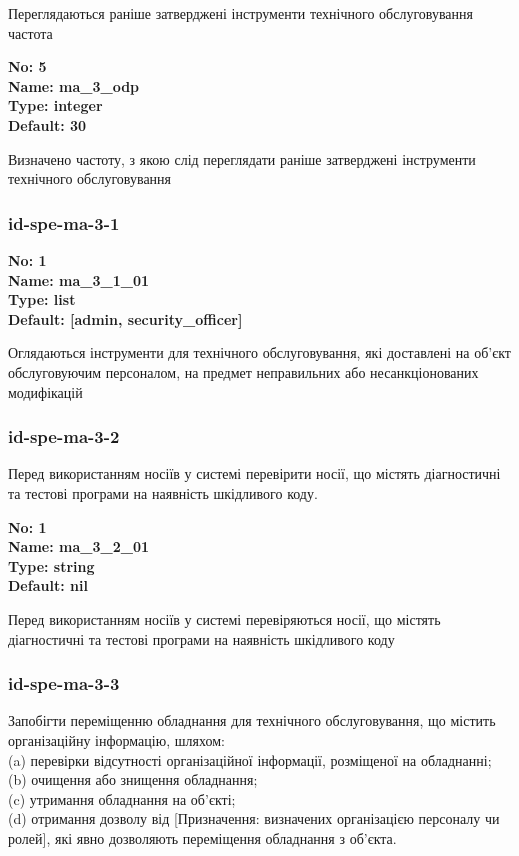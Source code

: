 \documentclass{article}
\begin{document}
{\footnotesize Переглядаються раніше затверджені інструменти технічного обслуговування частота}


{\footnotesize\bfseries
No: 5\\
Name: ma\_\allowbreak{}3\_\allowbreak{}odp\\
Type: integer\\
Default: 30
}

{\footnotesize Визначено частоту, з якою слід переглядати раніше затверджені інструменти технічного обслуговування}




\subsubsection{id-spe-ma-3-1}


\vspace{10pt}
{\footnotesize\bfseries
No: 1\\
Name: ma\_\allowbreak{}3\_\allowbreak{}1\_\allowbreak{}01\\
Type: list\\
Default: [\textquotedbl{}admin\textquotedbl{}, \textquotedbl{}security\_\allowbreak{}officer\textquotedbl{}]
}

{\footnotesize Оглядаються інструменти для технічного обслуговування, які доставлені на об'єкт обслуговуючим персоналом, на предмет неправильних або несанкціонованих модифікацій}




\subsubsection{id-spe-ma-3-2}
Перед використанням носіїв у системі перевірити носії, що містять діагностичні та тестові програми на наявність шкідливого коду.

\vspace{10pt}
{\footnotesize\bfseries
No: 1\\
Name: ma\_\allowbreak{}3\_\allowbreak{}2\_\allowbreak{}01\\
Type: string\\
Default: nil
}

{\footnotesize Перед використанням носіїв у системі перевіряються носії, що містять діагностичні та тестові програми на наявність шкідливого коду}




\subsubsection{id-spe-ma-3-3}
Запобігти переміщенню обладнання для технічного обслуговування, що містить організаційну інформацію, шляхом:\\ 
(a) перевірки відсутності організаційної інформації, розміщеної на обладнанні;\\ 
(b) очищення або знищення обладнання;\\ 
(c) утримання обладнання на об'єкті;\\ 
(d) отримання дозволу від [Призначення: визначених організацією персоналу чи ролей], які явно дозволяють переміщення обладнання з об'єкта.
\end{document}
